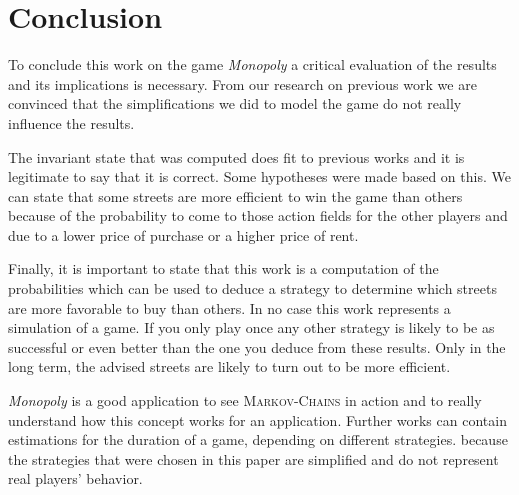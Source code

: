 \section{Conclusion} %
\label{sec:conclusion}

To conclude this work on the game \textit{Monopoly} a critical evaluation of the results and its 
implications is necessary. From our research on previous work we are convinced that the 
simplifications we did to model the game do not really influence the results. 

The invariant state that was computed does fit to previous works and it is legitimate to say 
that it is correct. Some hypotheses were made based on this. 
We can state that some streets are more efficient to win the game than others because of the 
probability to come to those action fields for the other players and due to a lower price of
purchase or a higher price of rent.


Finally, it is important to state that this work is a computation of the probabilities which can 
be used to deduce a strategy to determine which streets are more favorable to buy than others. In no
case this work represents a simulation of a game. If you only play once any other strategy is likely 
to be as successful or even better than the one you deduce from these results. Only in the long term, 
the advised streets are likely to turn out to be more efficient.

\textit{Monopoly} is a good application to see \textsc{Markov-Chains} in action and to really 
understand how this concept works for an application. Further works can contain estimations for 
the duration of a game, depending on different strategies. because the strategies that were 
chosen in this paper are simplified and do not represent real players' behavior. 

